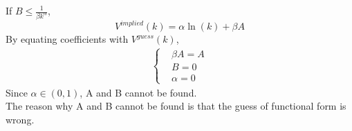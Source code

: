 \documentclass{article}
\begin{document}
\begin{enumerate}
\begin{enumerate}
            If $B\le\frac{1}{\beta k^\alpha}$,
            \begin{equation*}
                V^{implied}(k)=\alpha\ln(k)+\beta A
            \end{equation*}
            By equating coefficients with $V^{guess}(k)$,
            \begin{align*}
                \left\{\begin{aligned}
                    &\beta A=A\\
                    &B=0\\
                    &\alpha=0
                \end{aligned}\right.
            \end{align*}
            Since $\alpha\in(0,1)$, A and B cannot be found.\\
            The reason why A and B cannot be found is that the guess of functional form is wrong.
        \end{enumerate}
    \end{enumerate}
\end{document}
